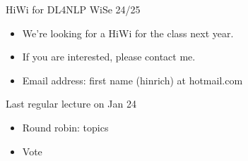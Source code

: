 \begin{vbframe}{HiWi for DL4NLP WiSe 24/25}

\vfill

	\begin{itemize}
\item We're looking for a HiWi for the class next year.
\item If you are interested, please contact me.
\item Email
address:
first name (hinrich) at hotmail.com
\end{itemize}

\vfill

\end{vbframe}



\begin{vbframe}{Last regular lecture on Jan 24}

\vfill

	\begin{itemize}
\item Round robin: topics
\item Vote
\end{itemize}

\vfill

\end{vbframe}


\endlecture

